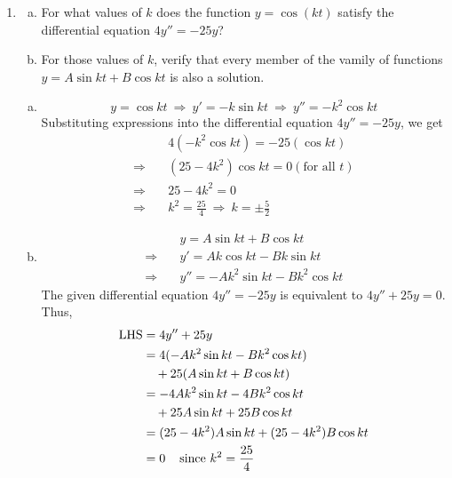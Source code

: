\begin{enumerate}
\item
\begin{Question}
\begin{enumerate}[(a)]
\item For what values of $k$ does the function $y = \cos(kt)$ satisfy
  the differential equation $4y'' = -25y$?
\item For those values of $k$, verify that every member of the vamily of functions $y = A\sin kt + B\cos kt$ is also a solution.
\end{enumerate}
\end{Question}

\begin{Solution}
\begin{enumerate}[(a)]
\item \begin{equation*}
		y = \cos kt \ \Rightarrow \ y' = -k \sin kt \ \Rightarrow \ y'' = -k^2 \cos kt
	\end{equation*}
	Substituting expressions into the differential equation $4y'' = -25y$, we get 
	\begin{align*}
		&4(-k^2\cos kt) = -25(\cos kt) \\
		\Rightarrow \quad &(25 - 4k^2) \cos kt = 0 (\text{for all } t)\\
		\Rightarrow \quad &25 - 4k^2 = 0 \\
		\Rightarrow \quad &k^2 = \frac{25}{4} \ \Rightarrow \ k = \pm \frac{5}{2}
	\end{align*}
	
\item \begin{align*}
		&y = A\sin kt + B \cos kt \\
		\Rightarrow \quad &y' = Ak\cos kt - Bk \sin kt \\
		\Rightarrow \quad &y'' = -Ak^2 \sin kt - Bk^2 \cos kt
	\end{align*}
	The given differential equation $4y'' = -25y$ is equivalent to $4y'' + 25y = 0$.  Thus,
\begin{align*}
	\text{LHS} &= 4y'' + 25y \\
	&= 4(-Ak^2 \sin kt - Bk^2 \cos kt) \\
	& \quad + 25(A\sin kt + B\cos kt) \\
	&= -4Ak^2 \sin kt - 4Bk^2 \cos kt \\
	& \quad+ 25A\sin kt + 25B \cos kt \\
	&= (25 - 4k^2)A\sin kt + (25 - 4k^2)B\cos kt \\
	&= 0 \hspace{4mm} \text{since } k^2 = \frac{25}{4}
\end{align*}
\end{enumerate}
\end{Solution}


\end{enumerate}
